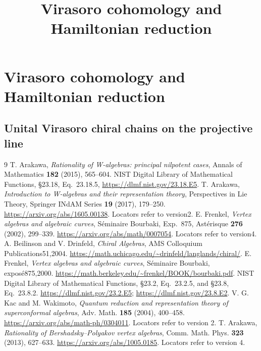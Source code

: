 \documentclass[11pt,oneside]{memoir}
\title{Virasoro cohomology and Hamiltonian reduction}
\author{}
\date{}
\providecommand{\Res}{\operatorname{Res}}
\begin{document}
\chapter{Virasoro cohomology and Hamiltonian reduction}







\begingroup
\providecommand{\Res}{\operatorname{Res}}\providecommand{\Vir}{\operatorname{Vir}}\providecommand{\Aut}{\operatorname{Aut}}

\endgroup
\section{Unital Virasoro chiral chains on the projective line}\label{sec:cbc26-unital-p1}





\begin{thebibliography}{9}
 T. Arakawa, \emph{Rationality of W-algebras: principal nilpotent cases}, Annals of Mathematics \textbf{182} (2015), 565--604.
 NIST Digital Library of Mathematical Functions, \S23.18, Eq.~23.18.5, \url{https://dlmf.nist.gov/23.18.E5}.
 T. Arakawa, \emph{Introduction to W-algebras and their representation theory}, Perspectives in Lie Theory, Springer INdAM Series \textbf{19} (2017), 179--250. \url{https://arxiv.org/abs/1605.00138}. Locators refer to version2.
 E. Frenkel, \emph{Vertex algebras and algebraic curves}, S\'eminaire Bourbaki, Exp.~875, Ast\'erisque \textbf{276} (2002), 299--339. \url{https://arxiv.org/abs/math/0007054}. Locators refer to version4.
 A. Beilinson and V. Drinfeld, \emph{Chiral Algebras}, AMS Colloquium Publications51,2004. \url{https://math.uchicago.edu/~drinfeld/langlands/chiral/}.
 E. Frenkel, \emph{Vertex algebras and algebraic curves}, S\'eminaire Bourbaki, expos\'e875,2000. \url{https://math.berkeley.edu/~frenkel/BOOK/bourbaki.pdf}.
 NIST Digital Library of Mathematical Functions, \S23.2, Eq.~23.2.5, and \S23.8, Eq.~23.8.2. \url{https://dlmf.nist.gov/23.2.E5}; \url{https://dlmf.nist.gov/23.8.E2}.
 V. G. Kac and M. Wakimoto, \emph{Quantum reduction and representation theory of superconformal algebras}, Adv. Math. \textbf{185} (2004), 400--458. \url{https://arxiv.org/abs/math-ph/0304011}. Locators refer to version 2.
 T. Arakawa, \emph{Rationality of Bershadsky--Polyakov vertex algebras}, Comm. Math. Phys. \textbf{323} (2013), 627--633. \url{https://arxiv.org/abs/1005.0185}. Locators refer to version 4.
\end{thebibliography}
\end{document}

